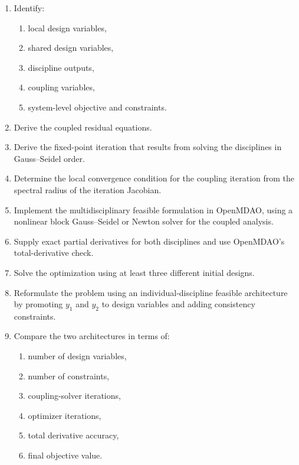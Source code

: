 \begin{enumerate}
    \item Identify:
    \begin{enumerate}
        \item local design variables,
        \item shared design variables,
        \item discipline outputs,
        \item coupling variables,
        \item system-level objective and constraints.
    \end{enumerate}

    \item Derive the coupled residual equations.

    \item Derive the fixed-point iteration that results from solving the
    disciplines in Gauss--Seidel order.

    \item Determine the local convergence condition for the coupling
    iteration from the spectral radius of the iteration Jacobian.

    \item Implement the multidisciplinary feasible formulation in OpenMDAO,
    using a nonlinear block Gauss--Seidel or Newton solver for the coupled
    analysis.

    \item Supply exact partial derivatives for both disciplines and use
    OpenMDAO's total-derivative check.

    \item Solve the optimization using at least three different initial
    designs.

    \item Reformulate the problem using an individual-discipline feasible
    architecture by promoting $y_1$ and $y_2$ to design variables and adding
    consistency constraints.

    \item Compare the two architectures in terms of:
    \begin{enumerate}
        \item number of design variables,
        \item number of constraints,
        \item coupling-solver iterations,
        \item optimizer iterations,
        \item total derivative accuracy,
        \item final objective value.
    \end{enumerate}


\end{enumerate}
